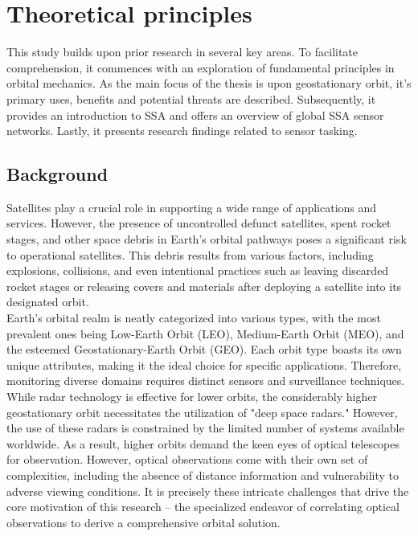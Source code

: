 \chapter{Theoretical principles}
\label{sec:grundlagen}

This study builds upon prior research in several key areas. To facilitate comprehension, it commences with an exploration of fundamental principles in orbital mechanics. As the main focus of the thesis is upon geostationary orbit,
it's primary uses, benefits and potential  threats are described.
Subsequently, it provides an introduction to SSA and offers an overview of global SSA sensor networks. Lastly, it presents research findings
 related to sensor tasking.

\section{Background}
Satellites play a crucial role in supporting a wide range of applications and services. However, the presence of uncontrolled defunct satellites, spent rocket stages, 
and other space debris in Earth's orbital pathways poses a significant risk to operational satellites. This debris results from various factors, including explosions, 
collisions, and even intentional practices such as leaving discarded rocket stages or releasing covers and materials after deploying a satellite into its designated orbit.\\

Earth's orbital realm is neatly categorized into various types, with the most prevalent ones being Low-Earth Orbit (LEO), Medium-Earth Orbit (MEO), and the esteemed Geostationary-Earth Orbit (GEO).
Each orbit type boasts its own unique attributes, making it the ideal choice for specific applications. Therefore, monitoring diverse domains requires distinct sensors and surveillance techniques. 
While radar technology is effective for lower orbits, the considerably higher geostationary orbit necessitates the utilization of "deep space radars." However, the use of these radars is constrained 
by the limited number of systems available worldwide. As a result, higher orbits demand the keen eyes of optical telescopes for observation. However, optical observations come with their own set of complexities, 
including the absence of distance information and vulnerability to adverse viewing conditions. It is precisely these intricate challenges that drive the core motivation of this research – the 
specialized endeavor of correlating optical observations to derive a comprehensive orbital solution.


